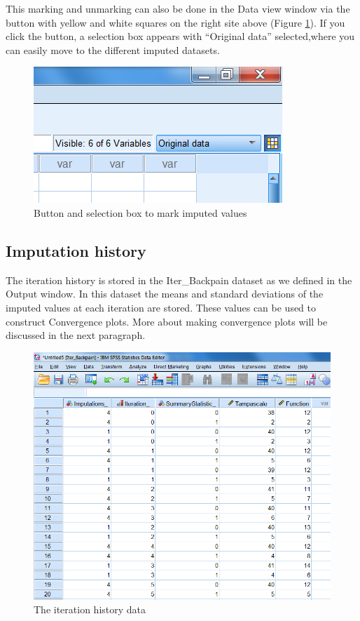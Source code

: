 \documentclass[]{book}
\begin{document}
This marking and unmarking can also be done in the Data view window via
the button with yellow and white squares on the right site above (Figure
\ref{fig:fig4-11}). If you click the button, a selection box appears
with ``Original data'' selected,where you can easily move to the
different imputed datasets.

\begin{figure}

{\centering \includegraphics[width=0.9\linewidth]{images/fig4.11} 

}

\caption{Button and selection box to mark imputed values}\label{fig:fig4-11}
\end{figure}

\subsection{Imputation history}\label{imputation-history}

The iteration history is stored in the Iter\_Backpain dataset as we
defined in the Output window. In this dataset the means and standard
deviations of the imputed values at each iteration are stored. These
values can be used to construct Convergence plots. More about making
convergence plots will be discussed in the next paragraph.

\begin{figure}

{\centering \includegraphics[width=0.9\linewidth]{images/fig4.12} 

}

\caption{The iteration history data}\label{fig:fig4-12}
\end{figure}
\end{document}
